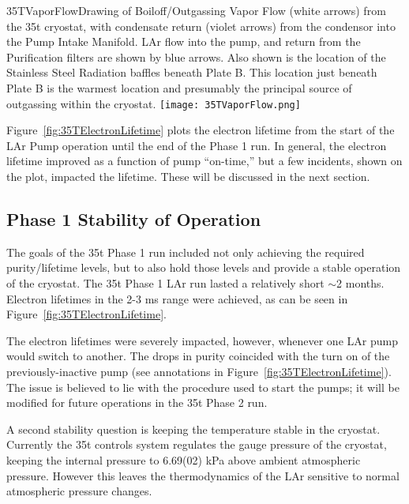 \begin{cdrfigure}{35TVaporFlow}{Drawing of Boiloff/Outgassing Vapor Flow (white 
arrows) from the 35t cryostat, with condensate return (violet arrows) from the condensor into the Pump 
Intake Manifold. LAr flow into the pump, and return from the Purification filters are shown by blue 
arrows. Also shown is the location of the Stainless Steel Radiation baffles beneath Plate B. This location 
just beneath Plate B is the warmest location and presumably the principal source of outgassing within the 
cryostat.}
  \texttt{[image: 35TVaporFlow.png]}
\end{cdrfigure}

Figure~\ref{fig:35TElectronLifetime} plots the electron lifetime from the start of the LAr Pump operation until the end of the Phase 1 run. In general, the electron lifetime improved as a function of pump 
``on-time,'' but %
a few incidents, shown on the plot, %
impacted the lifetime. These will be discussed in the next section.

\subsection {Phase 1 Stability of Operation}

The goals of the 35t Phase 1 run included not only achieving the required purity/lifetime levels, but to 
also hold those levels and provide  a stable operation of the cryostat. The 35t Phase 1 LAr run lasted a relatively 
short $\sim$2 months.%
Electron lifetimes in the 2-3 ms range were achieved, as can be seen in 
Figure~\ref{fig:35TElectronLifetime}.

The electron lifetimes were severely impacted, however, whenever one LAr pump would switch to 
another. The drops in purity coincided with the turn on of the previously-inactive pump (see annotations 
in Figure~\ref{fig:35TElectronLifetime}). The issue is believed to lie with the procedure used to start the 
pumps; it will be modified for future operations in the 35t Phase 2 run.

A second stability question is keeping the temperature stable in the cryostat. Currently the 35t controls 
system regulates the gauge pressure of the cryostat, keeping the internal pressure to 6.69(02) kPa above 
ambient atmospheric pressure. However this leaves the thermodynamics of the LAr sensitive to normal 
atmospheric pressure changes.

